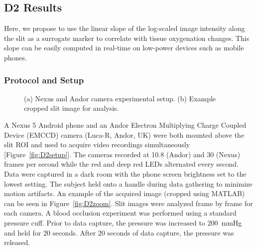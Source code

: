 \subsection{D2 Results}
Here, we propose to use the linear slope of the log-scaled image intensity along the slit as a surrogate marker to correlate with tissue oxygenation changes. This slope can be easily computed in real-time on low-power devices such as mobile phones.
    
\subsubsection{Protocol and Setup}
\begin{figure}
    \begin{center}
    \end{center}
    \caption{(a) Nexus and Andor camera experimental setup. (b) Example cropped slit image for analysis.} 
    \label{fig:D2protocol}
\end{figure} 
A Nexus 5 Android phone and an Andor Electron Multiplying Charge Coupled Device (EMCCD) camera (Luca-R, Andor, UK) were both mounted above the slit ROI and used to acquire video recordings simultaneously [Figure~\ref{fig:D2setup}]. The cameras recorded at 10.8 (Andor) and 30 (Nexus) frames per second while the red and deep red LEDs alternated every second. Data were captured in a dark room with the phone screen brightness set to the lowest setting. The subject held onto a handle during data gathering to minimize motion artifacts. An example of the acquired image (cropped using MATLAB) can be seen in Figure~\ref{fig:D2zoom}. Slit images were analyzed frame by frame for each camera. A blood occlusion experiment was performed using a standard pressure cuff. Prior to data capture, the pressure was increased to 200~mmHg and held for 20 seconds. After 20 seconds of data capture, the pressure was released. 
        
